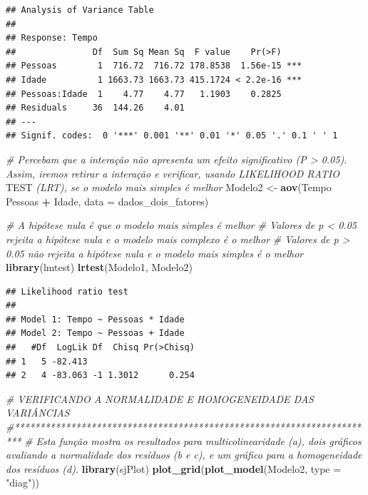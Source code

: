 \documentclass[
]{book}
\newenvironment{Shaded}{\begin{snugshade}}{\end{snugshade}}
\newcommand{\AlertTok}[1]{\textcolor[rgb]{0.94,0.16,0.16}{#1}}
\newcommand{\CommentTok}[1]{\textcolor[rgb]{0.56,0.35,0.01}{\textit{#1}}}
\newcommand{\DataTypeTok}[1]{\textcolor[rgb]{0.13,0.29,0.53}{#1}}
\newcommand{\KeywordTok}[1]{\textcolor[rgb]{0.13,0.29,0.53}{\textbf{#1}}}
\newcommand{\NormalTok}[1]{#1}
\newcommand{\OperatorTok}[1]{\textcolor[rgb]{0.81,0.36,0.00}{\textbf{#1}}}
\newcommand{\StringTok}[1]{\textcolor[rgb]{0.31,0.60,0.02}{#1}}
\begin{document}
\begin{verbatim}
## Analysis of Variance Table
## 
## Response: Tempo
##               Df  Sum Sq Mean Sq  F value    Pr(>F)    
## Pessoas        1  716.72  716.72 178.8538  1.56e-15 ***
## Idade          1 1663.73 1663.73 415.1724 < 2.2e-16 ***
## Pessoas:Idade  1    4.77    4.77   1.1903    0.2825    
## Residuals     36  144.26    4.01                       
## ---
## Signif. codes:  0 '***' 0.001 '**' 0.01 '*' 0.05 '.' 0.1 ' ' 1
\end{verbatim}

\begin{Shaded}
\begin{Highlighting}[]
\CommentTok{# Percebam que a interação não apresenta um efeito significativo (P > 0.05). Assim, iremos retirar a interação e verificar, usando LIKELIHOOD RATIO }\AlertTok{TEST}\CommentTok{ (LRT), se o modelo mais simples é melhor }
\NormalTok{Modelo2 <-}\StringTok{ }\KeywordTok{aov}\NormalTok{(Tempo }\OperatorTok{~}\StringTok{ }\NormalTok{Pessoas }\OperatorTok{+}\StringTok{ }\NormalTok{Idade, }\DataTypeTok{data =}\NormalTok{ dados_dois_fatores) }

\CommentTok{# A hipótese nula é que o modelo mais simples é melhor}
\CommentTok{# Valores de p < 0.05 rejeita a hipótese nula e o modelo mais complexo é o melhor}
\CommentTok{# Valores de p > 0.05 não rejeita a hipótese nula e o modelo mais simples é o melhor}
\KeywordTok{library}\NormalTok{(lmtest)}
\KeywordTok{lrtest}\NormalTok{(Modelo1, Modelo2)}
\end{Highlighting}
\end{Shaded}

\begin{verbatim}
## Likelihood ratio test
## 
## Model 1: Tempo ~ Pessoas * Idade
## Model 2: Tempo ~ Pessoas + Idade
##   #Df  LogLik Df  Chisq Pr(>Chisq)
## 1   5 -82.413                     
## 2   4 -83.063 -1 1.3012      0.254
\end{verbatim}

\begin{Shaded}
\begin{Highlighting}[]
\CommentTok{# VERIFICANDO A NORMALIDADE E HOMOGENEIDADE DAS VARIÂNCIAS}
\CommentTok{#***********************************************************************}
\CommentTok{# Esta função mostra os resultados para multicolinearidade (a), dois gráficos avaliando a normalidade dos resíduos (b e  c), e um gráfico para a homogeneidade dos resíduos (d).}
\KeywordTok{library}\NormalTok{(sjPlot)}
\KeywordTok{plot_grid}\NormalTok{(}\KeywordTok{plot_model}\NormalTok{(Modelo2, }\DataTypeTok{type =} \StringTok{"diag"}\NormalTok{))}
\end{Highlighting}
\end{Shaded}
\end{document}
